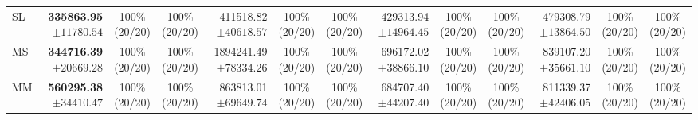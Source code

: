 \documentclass[10pt]{article}
\begin{document}
\begin{table}[!htbp]
\begin{tabular}{@{}l*{4}{rcc}@{}}
SL & \shortstack[r]{\textbf{335863.95}\\$\pm 11780.54$} & \shortstack[c]{100\%\\(20/20)} & \shortstack[c]{100\%\\(20/20)} & \shortstack[r]{411518.82\\$\pm 40618.57$} & \shortstack[c]{100\%\\(20/20)} & \shortstack[c]{100\%\\(20/20)} & \shortstack[r]{429313.94\\$\pm 14964.45$} & \shortstack[c]{100\%\\(20/20)} & \shortstack[c]{100\%\\(20/20)} & \shortstack[r]{479308.79\\$\pm 13864.50$} & \shortstack[c]{100\%\\(20/20)} & \shortstack[c]{100\%\\(20/20)} \\
MS & \shortstack[r]{\textbf{344716.39}\\$\pm 20669.28$} & \shortstack[c]{100\%\\(20/20)} & \shortstack[c]{100\%\\(20/20)} & \shortstack[r]{1894241.49\\$\pm 78334.26$} & \shortstack[c]{100\%\\(20/20)} & \shortstack[c]{100\%\\(20/20)} & \shortstack[r]{696172.02\\$\pm 38866.10$} & \shortstack[c]{100\%\\(20/20)} & \shortstack[c]{100\%\\(20/20)} & \shortstack[r]{839107.20\\$\pm 35661.10$} & \shortstack[c]{100\%\\(20/20)} & \shortstack[c]{100\%\\(20/20)} \\
MM & \shortstack[r]{\textbf{560295.38}\\$\pm 34410.47$} & \shortstack[c]{100\%\\(20/20)} & \shortstack[c]{100\%\\(20/20)} & \shortstack[r]{863813.01\\$\pm 69649.74$} & \shortstack[c]{100\%\\(20/20)} & \shortstack[c]{100\%\\(20/20)} & \shortstack[r]{684707.40\\$\pm 44207.40$} & \shortstack[c]{100\%\\(20/20)} & \shortstack[c]{100\%\\(20/20)} & \shortstack[r]{811339.37\\$\pm 42406.05$} & \shortstack[c]{100\%\\(20/20)} & \shortstack[c]{100\%\\(20/20)} \\

\end{tabular}
\end{table}
\end{document}

